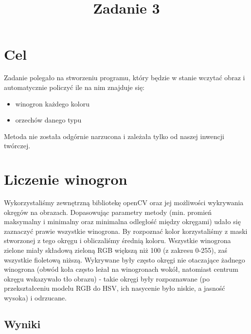 \documentclass{classrep}
\author{
  \studentinfo{Hubert Marcinkowski}{214942} \and
  \studentinfo{Artur Wróblewski}{214985}
}
\title{Zadanie 3}
\begin{document}
\maketitle


\section{Cel}
Zadanie polegało na stworzeniu programu, który będzie w stanie wczytać obraz i automatycznie policzyć ile na nim znajduje się:
\begin{itemize}
\item winogron każdego koloru
\item orzechów danego typu
\end{itemize}
Metoda nie została odgórnie narzucona i zależała tylko od naszej inwencji twórczej.

\section{Liczenie winogron}

Wykorzystaliśmy zewnętrzną bibliotekę openCV oraz jej możliwości wykrywania okręgów na obrazach. Dopasowując parametry metody (min. promień maksymalny i minimalny oraz minimalna odległość między okręgami) udało się zaznaczyć prawie wszystkie winogrona. By rozpoznać kolor korzystaliśmy z maski stworzonej z tego okręgu i obliczaliśmy średnią koloru. Wszystkie winogrona zielone miały składową zieloną RGB większą niż 100 (z zakresu 0-255), zaś wszystkie fioletową niższą. Wykrywane były często okręgi nie otaczające żadnego winogrona (obwód koła często leżał na winogronach wokół, natomiast centrum okręgu wskazywało tło obrazu) - takie okręgi były rozpoznawane (po przekształceniu modelu RGB do HSV, ich nasycenie było niskie, a jasność wysoka) i odrzucane.

\subsection{Wyniki}
\end{document}
